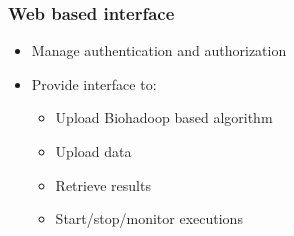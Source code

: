 \begin{frame}
  \frametitle{Web based interface}
  \begin{itemize}
    \item Manage authentication and authorization
    \item Provide interface to:
    \begin{itemize}
      \item Upload Biohadoop based algorithm
      \item Upload data
      \item Retrieve results
      \item Start/stop/monitor executions
    \end{itemize}
  \end{itemize}
\end{frame}
